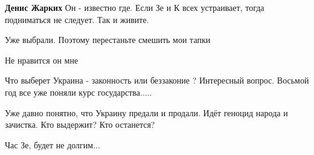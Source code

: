 \begin{itemize}
\begin{itemize}
\textbf{Денис Жарких}
Он - известно где.
Если Зе и К всех устраивает, тогда подниматься не следует. Так и живите.
\end{itemize} %

Уже выбрали.
Поэтому перестаньте смешить мои тапки

Не нравится он мне

Что выберет Украина - законность или беззаконие ? Интересный вопрос. Восьмой год все уже поняли курс государства.....


Уже давно понятно, что Украину предали и продали. Идёт геноцид народа и
зачистка. Кто выдержит? Кто останется?

Час Зе, будет не долгим...

\end{itemize} %
